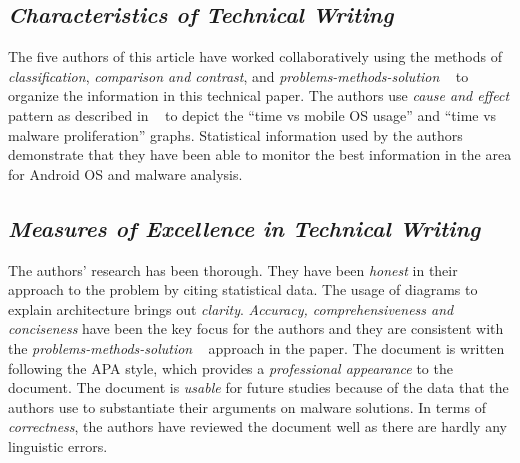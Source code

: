 \documentclass[letterpaper,10pt]{texMemo}
\begin{document}
\subsection*{\textit{Characteristics of Technical Writing}}
        The five authors of this article have worked collaboratively using the methods of \textit{classification}, \textit{comparison and contrast}, and \textit{problems-methods-solution} ~\cite{markel_selber_2018_org_info} to organize the information in this technical paper. The authors use \textit{cause and effect} pattern as described in ~\cite{markel_selber_2018_org_info} to depict the \enquote{time vs mobile OS usage} and \enquote{time vs malware proliferation} graphs. Statistical information used by the authors demonstrate that they have been able to monitor the best information in the area for Android OS and malware analysis.

\subsection*{\textit{Measures of Excellence in Technical Writing}}
The authors' research has been thorough. They have been \textit{honest} in their approach to the problem by citing statistical data. The usage of diagrams to explain architecture brings out \textit{clarity}. \textit{Accuracy, comprehensiveness and conciseness} have been the key focus for the authors and they are consistent with the \textit{problems-methods-solution} ~\cite{markel_selber_2018_org_info} approach in the paper. The document is written following the APA style, which provides a \textit{professional appearance} to the document. The document is \textit{usable} for future studies because of the data that the authors use to substantiate their arguments on malware solutions. In terms of \textit{correctness}, the authors have reviewed the document well as there are hardly any linguistic errors.
\end{document}
